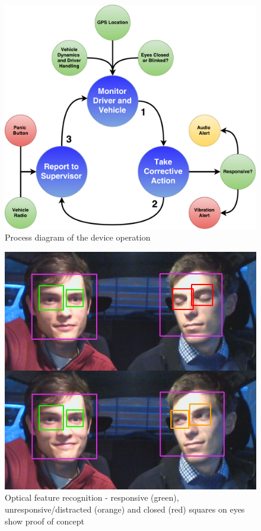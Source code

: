 \begin{figure}[H]
\centering
\includegraphics[width=1\textwidth]{images/NVP_Poster_Flowchart.pdf}
\vskip10pt
\caption[Device Operation Activity Diagram]{Process diagram of the device operation}
\label{fig:DeviceFlowChart}
\end{figure}


\begin{figure}[H]
\centering
\includegraphics[width=1\textwidth]{images/ocv}
\vskip10pt
\caption[Optical feature recognition]{Optical feature recognition - responsive (green), unresponsive/distracted (orange) and closed (red) squares on eyes show proof of concept}
\label{fig:DeviceFlowChart}
\end{figure}

